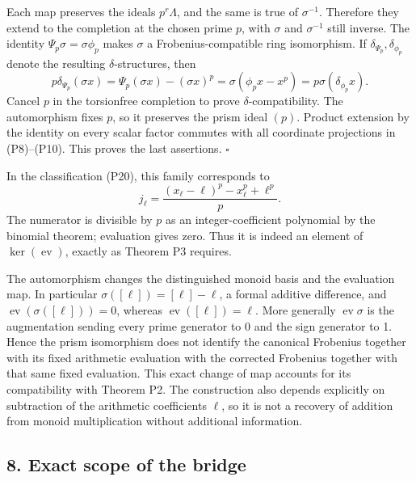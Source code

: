 \documentclass[
]{article}
\begin{document}
Each map preserves the ideals \(p^r\Lambda\), and the same is true of
\(\sigma^{-1}\). Therefore they extend to the completion at the chosen
prime \(p\), with \(\sigma\) and \(\sigma^{-1}\) still inverse. The
identity \(\Psi_p\sigma=\sigma\phi_p\) makes \(\sigma\) a
Frobenius-compatible ring isomorphism. If
\(\delta_{\Psi_p},\delta_{\phi_p}\) denote the resulting
\(\delta\)-structures, then \[
p\delta_{\Psi_p}(\sigma x)
=\Psi_p(\sigma x)-(\sigma x)^p
=\sigma(\phi_p x-x^p)
=p\sigma(\delta_{\phi_p}x).
\] Cancel \(p\) in the torsionfree completion to prove
\(\delta\)-compatibility. The automorphism fixes \(p\), so it preserves
the prism ideal \((p)\). Product extension by the identity on every
scalar factor commutes with all coordinate projections in (P8)--(P10).
This proves the last assertions. \(\square\)

In the classification (P20), this family corresponds to \[
j_\ell=\frac{(x_\ell-\ell)^p-x_\ell^p+\ell^p}{p}.
\tag{P42}
\] The numerator is divisible by \(p\) as an integer-coefficient
polynomial by the binomial theorem; evaluation gives zero. Thus it is
indeed an element of \(\ker(\operatorname{ev})\), exactly as Theorem P3
requires.

The automorphism changes the distinguished monoid basis and the
evaluation map. In particular \(\sigma([\ell])=[\ell]-\ell\), a formal
additive difference, and \(\operatorname{ev}(\sigma([\ell]))=0\),
whereas \(\operatorname{ev}([\ell])=\ell\). More generally
\(\operatorname{ev}\sigma\) is the augmentation sending every prime
generator to 0 and the sign generator to 1. Hence the prism isomorphism
does not identify the canonical Frobenius together with its fixed
arithmetic evaluation with the corrected Frobenius together with that
same fixed evaluation. This exact change of map accounts for its
compatibility with Theorem P2. The construction also depends explicitly
on subtraction of the arithmetic coefficients \(\ell\), so it is not a
recovery of addition from monoid multiplication without additional
information.

\subsection{8. Exact scope of the
bridge}\label{exact-scope-of-the-bridge}
\end{document}

